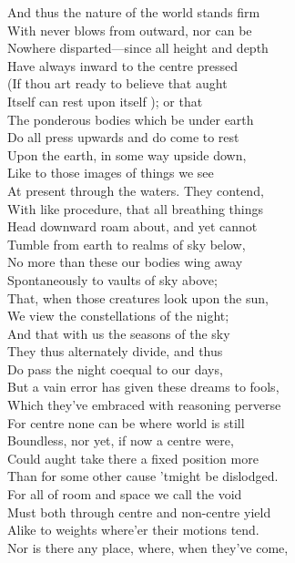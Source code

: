 And thus the nature of the world stands firm\\
With never blows from outward, nor can be\\
Nowhere disparted—since all height and depth\\
Have always inward to the centre pressed\\
(If thou art ready to believe that aught\\
Itself can rest upon itself ); or that\\
The ponderous bodies which be under earth\\
Do all press upwards and do come to rest\\
Upon the earth, in some way upside down,\\
Like to those images of things we see\\
At present through the waters. They contend,\\
With like procedure, that all breathing things\\
Head downward roam about, and yet cannot\\
Tumble from earth to realms of sky below,\\
No more than these our bodies wing away\\
Spontaneously to vaults of sky above;\\
That, when those creatures look upon the sun,\\
We view the constellations of the night;\\
And that with us the seasons of the sky\\
They thus alternately divide, and thus\\
Do pass the night coequal to our days,\\
But a vain error has given these dreams to fools,\\
Which they've embraced with reasoning perverse\\
For centre none can be where world is still\\
Boundless, nor yet, if now a centre were,\\
Could aught take there a fixed position more\\
Than for some other cause 'tmight be dislodged.\\
For all of room and space we call the void\\
Must both through centre and non-centre yield\\
Alike to weights where'er their motions tend.\\
Nor is there any place, where, when they've come,\\
